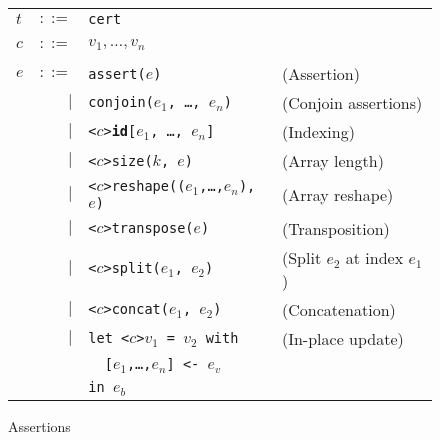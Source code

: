 \begin{figure}[bt]
\begin{tabular}{lrll}
$t$ & $::=$ & \texttt{cert} \\
\\
$c$ & $::=$ & $v_1, \ldots ,v_{n}$ \\
\\
$e$ & $::=$ & \texttt{assert($e$)} & (Assertion) \\
& $|$ & \texttt{conjoin($e_{1}$, \ldots, $e_{n}$)} & (Conjoin assertions) \\
& $|$ & \texttt{<$c$>\textbf{id}[$e_{1}$, \ldots, $e_{n}$]} & (Indexing) \\
& $|$ & \texttt{<$c$>size($k$, $e$)} & (Array length) \\
& $|$ & \texttt{<$c$>reshape(($e_{1}$,\ldots,$e_{n}$), $e$)} & (Array reshape) \\
& $|$ & \texttt{<$c$>transpose($e$)} & (Transposition) \\
& $|$ & \texttt{<$c$>split($e_{1}$, $e_{2}$)} & (Split $e_{2}$ at index $e_{1}$) \\
& $|$ & \texttt{<$c$>concat($e_{1}$, $e_{2}$)} & (Concatenation) \\
& $|$ & \texttt{let <$c$>$v_{1}$ = $v_{2}$ with} & (In-place update) \\
&     & \texttt{\ \ [$e_{1}$,\ldots,$e_{n}$] <- $e_{v}$} \\
&     & \texttt{in $e_{b}$} \\
\end{tabular}
\caption{Assertions}
\label{fig:assertions}
\end{figure}

